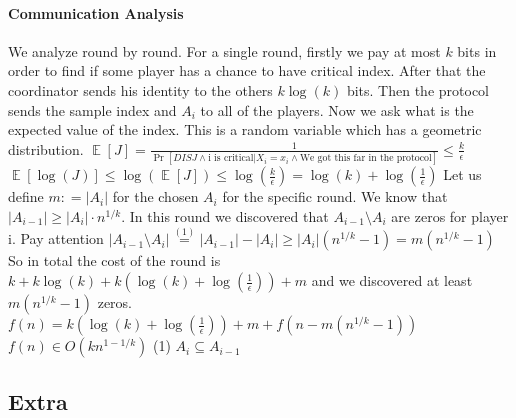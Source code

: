 \documentclass{article}
\begin{document}
\paragraph{Communication Analysis}
We analyze round by round. For a single round, firstly we pay at most $k$ bits in order to find if some player has a chance to have critical index. After that the coordinator sends his identity to the others $k\log(k)$ bits. Then the protocol sends the sample index and $A_{i}$ to all of the players. Now we ask what is the expected value of the index. \newline
This is a random variable which has a geometric distribution. \newline
$ \mathop{\mathbb{E}} [J] = \frac{1}{\Pr[DISJ \land \text{i is critical} | X_i = x_i \land \text{We got this far in the protocol}]} \leq \frac{k}{\epsilon}$ \newline
$\mathop{\mathbb{E}} [\log(J)] \leq \log(\mathop{\mathbb{E}} [J]) \leq \log(\frac{k}{\epsilon}) = \log(k) + \log(\frac{1}{\epsilon})$ \newline
Let us define $m : = |A_i|$ for the chosen $A_i$ for the specific round.
We know that $|A_{i-1}| \geq |A_i| \cdot n^{1/k}$. In this round we discovered that $A_{i-1} \setminus A_i$ are zeros for player i. Pay attention $|A_{i-1} \setminus A_i| \overset{(1)}{=} |A_{i-1}| - |A_i| \geq |A_i|(n^{1/k} - 1) = m(n^{1/k} - 1)$ \newline
So in total the cost of the round is $k + k\log(k) + k(\log(k) + \log(\frac{1}{\epsilon})) + m$ and we discovered at least $m(n^{1/k} - 1)$ zeros. \newline
$f(n) = k(\log(k) + \log(\frac{1}{\epsilon})) + m + f(n - m(n^{1/k} - 1))$ \newline 
$f(n) \in O(kn^{1-1/k})$ \newline
(1) $A_i \subseteq A_{i-1}$
\subsection{Extra}
\end{document}
